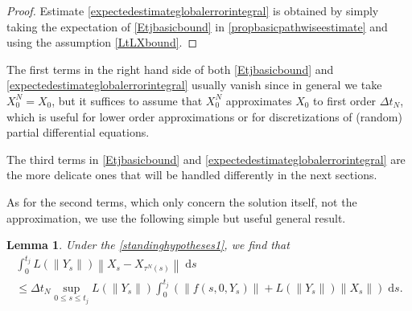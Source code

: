 \documentclass[reqno,12pt]{amsart}
\theoremstyle{plain} %
\newtheorem{lemma}{Lemma}[section]
\theoremstyle{definition} %
\begin{document}
\begin{proof}
    Estimate \eqref{expectedestimateglobalerrorintegral} is obtained by simply taking the expectation of \eqref{Etjbasicbound} in \cref{propbasicpathwiseestimate} and using the assumption \eqref{LtLXbound}.
\end{proof}


The first terms in the right hand side of both \eqref{Etjbasicbound} and \eqref{expectedestimateglobalerrorintegral} usually vanish since in general we take $X_0^N = X_0$, but it suffices to assume that $X_0^N$ approximates $X_0$ to first order $\Delta t_N$, which is useful for lower order approximations or for discretizations of (random) partial differential equations.

The third terms in \eqref{Etjbasicbound} and \eqref{expectedestimateglobalerrorintegral} are the more delicate ones that will be handled differently in the next sections.

As for the second terms, which only concern the solution itself, not the approximation, we use the following simple but useful general result.

\begin{lemma}
    \label{lemestimatesecondterminglobalerror}
    Under the \cref{standinghypotheses1}, we find that
    \begin{multline}
        \label{estimatesecondterminglobalerrorintegral}
        \int_0^{t_j}L(\|Y_s\|)\left\|X_s - X_{\tau^N(s)}\right\| \;\mathrm{d}s \\
        \leq \Delta t_N \sup_{0 \leq s \leq t_j}L(\|Y_s\|) \int_0^{t_j} \left(\|f(s, 0, Y_s)\| + L(\|Y_s\|)\|X_s\|\right) \;\mathrm{d}s.
    \end{multline}
\end{lemma}
\end{document}
